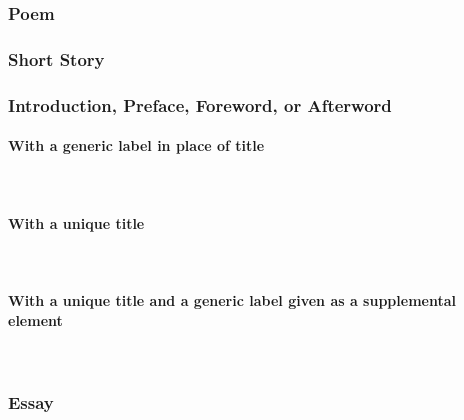 \documentclass{ltxdockit}
\newcommand{\myparagraph}[1]{\paragraph{#1}\mbox{}\\}
\begin{document}
\subsubsection{Poem} %
\label{sub:poem}
\begin{refsection}
	\printbibliography[heading=none]
\end{refsection}
\subsubsection{Short Story} %
\label{sub:short_story}
\begin{refsection}
	\printbibliography[heading=none]
\end{refsection}
\subsubsection{Introduction, Preface, Foreword, or Afterword} %
\label{sub:introduction_preface_foreword_or_afterword}
\myparagraph{With a generic label in place of title} %
\label{ssub:with_a_generic_label_in_place_of_title}
\begin{refsection}
	\printbibliography[heading=none]
\end{refsection}
\myparagraph{With a unique title} %
\label{ssub:with_a_unique_title}
\begin{refsection}
	\printbibliography[heading=none]
\end{refsection}
\myparagraph{With a unique title and a generic label given as a supplemental element} %
\label{ssub:with_a_unique_title_and_a_generic_label_given_as_a_supplemental_element}
\begin{refsection}
	\printbibliography[heading=none]
\end{refsection}
\subsubsection{Essay} %
\label{sub:essay}
\begin{refsection}
	\printbibliography[heading=none]
\end{refsection}
\end{document}
